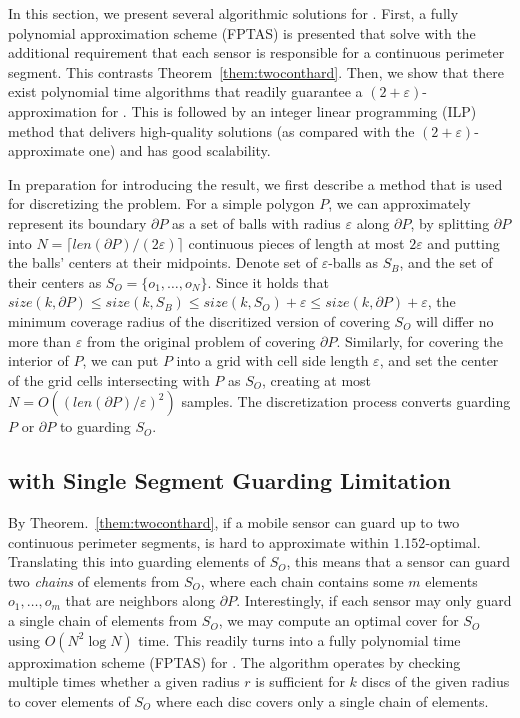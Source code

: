 \def\algomed{\textsc{Min\_Enclose\_Disc}\xspace}
In this section, we present several algorithmic solutions for \osgt. 
First, a fully polynomial approximation scheme (FPTAS)
is presented that solve \opgt with the additional requirement 
that each sensor is responsible for a continuous perimeter segment. 
This contrasts Theorem~\ref{them:twoconthard}. Then, we show that 
there exist polynomial time algorithms that readily guarantee a
$(2+\varepsilon)$-approximation for \osgt. This is followed by an 
integer linear programming (ILP) method that delivers high-quality
solutions (as compared with the $(2 + \varepsilon)$-approximate one)
and has good scalability. 

In preparation for introducing the result, we first describe a method
that is used for discretizing the problem. For a simple polygon $P$, 
we can approximately represent its boundary $\partial P$ as a set of 
balls with radius $\varepsilon$ along $\partial P$, by splitting  
$\partial P$ into $N=\lceil{len(\partial P)}/({2\varepsilon})\rceil$ 
continuous pieces of length at most $2\varepsilon$ and putting the balls' 
centers at their midpoints. 
%
Denote set of $\varepsilon$-balls as $S_B$, and the set of their centers 
as $S_O=\{o_1,\dots, o_N\}$. Since it holds that $size(k,\partial P) \leq 
size(k, S_B) \leq size(k, S_O) + \varepsilon \leq size(k, \partial P) 
+ \varepsilon$, the minimum coverage radius of the discritized version 
of covering $S_O$ will differ no more than $\varepsilon$ from the original 
problem of covering $\partial P$. Similarly, for covering the interior 
of $P$, we can put $P$ into a grid with cell side length $\varepsilon$, 
and set the center of the grid cells intersecting with $P$ as $S_O$, 
creating at most $N=O(({len(\partial P)}/{\varepsilon})^2)$ samples. 
The discretization process converts guarding $P$ or $\partial P$ to 
guarding $S_O$. 

\subsection{\opgt with Single Segment Guarding Limitation}\label{subsec:singleseg}
By Theorem.~\ref{them:twoconthard}, if a mobile sensor can guard up to two 
continuous perimeter segments, \osgt is hard to approximate within 
$1.152$-optimal. 
Translating this into guarding elements of $S_O$, this means that a sensor
can guard two {\em chains} of elements from $S_O$, where each chain contains 
some $m$ elements $o_1, \ldots, o_m$ that are neighbors along $\partial P$. 
Interestingly, if each sensor may only guard a single chain of elements 
from $S_O$, we may compute an optimal cover for $S_O$ using $O(N^2 \log N)$ 
time. This readily turns into a fully polynomial time approximation scheme 
(FPTAS) for \opgt. 
The algorithm operates by checking multiple times whether a given radius 
$r$ is sufficient for $k$ discs of the given radius to cover elements of 
$S_O$ where each disc covers only a single chain of elements. 


